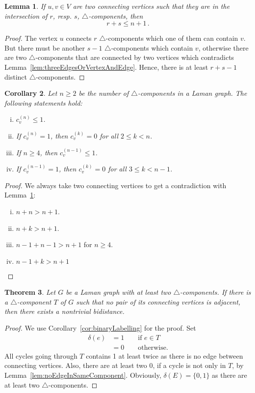 \documentclass[a4paper, 11pt]{article}
\newcommand{\trcomp}{$\triangle$-component}
\newcommand{\trcomps}{$\triangle$-components}
\newcommand{\cv}[1]{c_v^{(#1)}}
\newtheorem{thm}{Theorem}[section]
\newtheorem{lem}[thm]{Lemma}
\newtheorem{cor}[thm]{Corollary}
\theoremstyle{definition}
\begin{document}
\begin{lem}
\label{lem:twoConnectingVertices}
If $u,v\in V$ are two connecting vertices such that they are in the intersection of $r$, resp. $s$, \trcomps{}, then
$$
r+s\leq n+1\,.
$$
\end{lem}
\begin{proof}
The vertex $u$ connects $r$ \trcomps{} which one of them can contain $v$. But there must be another $s-1$ \trcomps{} which contain $v$, otherwise there are two \trcomps{} that are connected by two vertices which contradicts Lemma~\ref{lem:threeEdgesOrVertexAndEdge}. Hence, there is at least $r+s-1$ distinct \trcomps{}.
\end{proof}

\begin{cor}
Let $n\geq 2$ be the number of \trcomps{} in a Laman graph. The following statements hold:
\begin{enumerate}[i)]
	\item $\cv{n} \leq 1$.
	\item If $\cv{n} = 1$, then $\cv{k}=0$ for all $2\leq k<n$.
	\item If $n\geq 4$, then $\cv{n-1} \leq 1$.
	\item If $\cv{n-1} = 1$, then $\cv{k}=0$ for all $3\leq k<n-1$.
\end{enumerate}
\end{cor}
\begin{proof}
We always take two connecting vertices to get a contradiction with Lemma~\ref{lem:twoConnectingVertices}:
\begin{enumerate}[i)]
	\item $n+n >n +1$.
	\item $n +k>n+1$.
	\item $n-1+n-1>n+1$ for $n\geq 4$.
	\item $n-1+k>n+1$
\end{enumerate}
\end{proof}

\begin{thm}
\label{thm:componentWithNonadjacentVertices}
Let $G$ be a Laman graph with at least two \trcomps{}. If there is a \trcomp{} $T$ of $G$ such that no pair of its connecting vertices is adjacent, then there exists a nontrivial bidistance.
\end{thm}
\begin{proof}
We use Corollary~\ref{cor:binaryLabelling} for the proof. Set 
\begin{align*}
\delta(e)&=1 \qquad \text{if } e\in T \\
		&=0 \qquad \text{otherwise.}
\end{align*} 
All cycles going through $T$ contains 1 at least twice as there is no edge between connecting vertices. Also, there are at least two 0, if a cycle is not only in $T$, by Lemma~\ref{lem:noEdgeInSameComponent}. Obviously, $\delta(E)=\{0,1\}$ as there are at least two \trcomps{}.
\end{proof}
\end{document}
